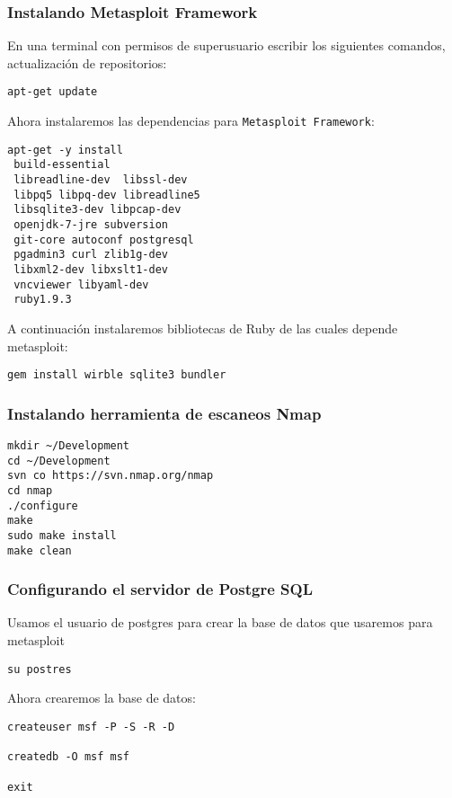 \documentclass[12pt,twocolumn]{report}
\begin{document}
\subsubsection{Instalando Metasploit Framework}
En una terminal con permisos de superusuario escribir los siguientes comandos, actualización de repositorios:

\begin{lstlisting}
apt-get update
\end{lstlisting}


Ahora instalaremos las dependencias para \texttt{Metasploit Framework}:

\begin{lstlisting}
apt-get -y install
 build-essential
 libreadline-dev  libssl-dev
 libpq5 libpq-dev libreadline5
 libsqlite3-dev libpcap-dev
 openjdk-7-jre subversion
 git-core autoconf postgresql
 pgadmin3 curl zlib1g-dev
 libxml2-dev libxslt1-dev
 vncviewer libyaml-dev
 ruby1.9.3
\end{lstlisting}


A continuación instalaremos bibliotecas de Ruby de las cuales depende metasploit:

\begin{lstlisting}
gem install wirble sqlite3 bundler
\end{lstlisting}


\subsubsection{Instalando herramienta de escaneos Nmap}

\begin{lstlisting}
mkdir ~/Development
cd ~/Development
svn co https://svn.nmap.org/nmap
cd nmap
./configure
make
sudo make install
make clean
\end{lstlisting}


\subsubsection{Configurando el servidor de Postgre SQL}

Usamos el usuario de postgres para crear la base de datos que usaremos para metasploit

\begin{lstlisting}
su postres
\end{lstlisting}


Ahora crearemos la base de datos:

\begin{lstlisting}
createuser msf -P -S -R -D

createdb -O msf msf

exit
\end{lstlisting}
\end{document}
